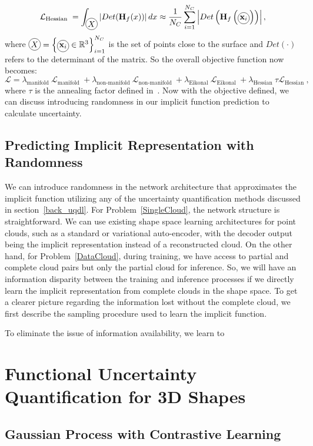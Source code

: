 \begin{equation}\label{Hessian}
    \mathcal{L}_{\text{Hessian }} = \int_{\circled{$X$}} \left|Det(\mathbf{H}_f(x))\right| d x \approx \frac{1}{N_C}\sum_{i=1}^{N_C} \left|Det\left(\mathbf{H}_f\left(\circled{$\mathbf{x}_i$}\right)\right)\right|,
\end{equation}
where $\circled{$X$}=\left\{\circled{$\mathbf{x}_i$} \in \mathbb{R}^{3}\right\}_{i=1}^{N_C}$ is the set of points close to the surface and $Det(\cdot)$ refers to the determinant of the matrix. So the overall objective function now becomes:
\begin{equation}
    \mathcal{L}= \lambda_{\text {manifold }} \mathcal{L}_{\text {manifold }}+\lambda_{\text {non-manifold }} \mathcal{L}_{\text {non-manifold }}+ \lambda_{\text {Eikonal }} \mathcal{L}_{\text {Eikonal }}+ \lambda_{\text{Hessian }} \tau \mathcal{L}_{\text{Hessian }},
\end{equation}
where $\tau$ is the annealing factor defined in~\cite{NeuralHessian}. Now with the objective defined, we can discuss introducing randomness in our implicit function prediction to calculate uncertainty.


    \subsection{Predicting Implicit Representation with Randomness}
    We can introduce randomness in the network architecture that approximates the implicit function utilizing any of the uncertainty quantification methods discussed in section~\ref{back_uqdl}. For Problem~\ref{SingleCloud}, the network structure is straightforward. We can use existing shape space learning architectures for point clouds, such as a standard or variational auto-encoder, with the decoder output being the implicit representation instead of a reconstructed cloud. On the other hand, for Problem~\ref{DataCloud}, during training, we have access to partial and complete cloud pairs but only the partial cloud for inference. So, we will have an information disparity between the training and inference processes if we directly learn the implicit representation from complete clouds in the shape space. To get a clearer picture regarding the information lost without the complete cloud, we first describe the sampling procedure used to learn the implicit function.
    
    To eliminate the issue of information availability, we learn to 
    


\section{Functional Uncertainty Quantification for 3D Shapes}



    \subsection{Gaussian Process with Contrastive Learning}



